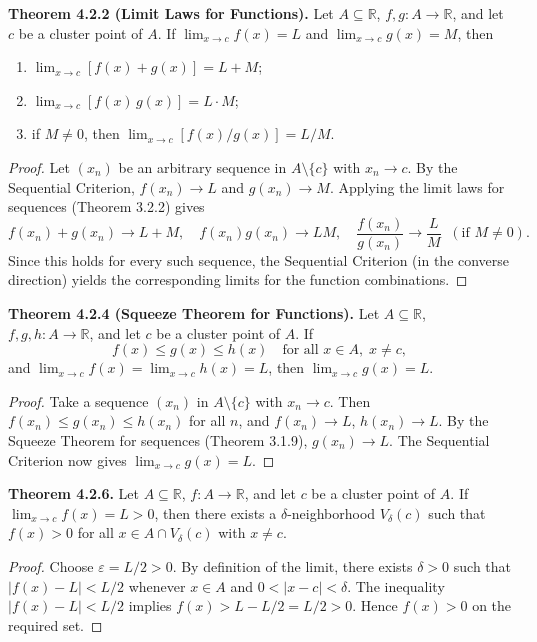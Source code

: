 \documentclass[12pt,a4paper]{article}
\theoremstyle{definition}
\newcommand{\R}{\mathbb{R}}
\newcommand{\eps}{\varepsilon}
\newcommand{\abs}[1]{\left\lvert#1\right\rvert}
\begin{document}
\textbf{Theorem 4.2.2 (Limit Laws for Functions).} Let \(A\subseteq\R\), \(f,g:A\to\R\), and let \(c\) be a cluster point of \(A\). If \(\lim_{x\to c}f(x)=L\) and \(\lim_{x\to c}g(x)=M\), then
\begin{enumerate}[label=(\alph*)]
    \item \(\lim_{x\to c}[f(x)+g(x)] = L+M\);
    \item \(\lim_{x\to c}[f(x)\,g(x)] = L\cdot M\);
    \item if \(M\neq0\), then \(\lim_{x\to c}[f(x)/g(x)] = L/M\).
\end{enumerate}

\begin{proof}
Let \((x_n)\) be an arbitrary sequence in \(A\setminus\{c\}\) with \(x_n\to c\). By the Sequential Criterion, \(f(x_n)\to L\) and \(g(x_n)\to M\). Applying the limit laws for sequences (Theorem 3.2.2) gives
\[
f(x_n)+g(x_n)\to L+M,\quad f(x_n)g(x_n)\to L M,\quad \frac{f(x_n)}{g(x_n)}\to \frac{L}{M}\;\;(\text{if }M\neq0).
\]
Since this holds for every such sequence, the Sequential Criterion (in the converse direction) yields the corresponding limits for the function combinations.
\end{proof}

\textbf{Theorem 4.2.4 (Squeeze Theorem for Functions).} Let \(A\subseteq\R\), \(f,g,h:A\to\R\), and let \(c\) be a cluster point of \(A\). If
\[
f(x)\le g(x)\le h(x)\quad\text{for all }x\in A,\;x\neq c,
\]
and \(\lim_{x\to c}f(x)=\lim_{x\to c}h(x)=L\), then \(\lim_{x\to c}g(x)=L\).

\begin{proof}
Take a sequence \((x_n)\) in \(A\setminus\{c\}\) with \(x_n\to c\). Then \(f(x_n)\le g(x_n)\le h(x_n)\) for all \(n\), and \(f(x_n)\to L\), \(h(x_n)\to L\). By the Squeeze Theorem for sequences (Theorem 3.1.9), \(g(x_n)\to L\). The Sequential Criterion now gives \(\lim_{x\to c}g(x)=L\).
\end{proof}

\textbf{Theorem 4.2.6.} Let \(A\subseteq\R\), \(f:A\to\R\), and let \(c\) be a cluster point of \(A\). If \(\lim_{x\to c}f(x)=L>0\), then there exists a \(\delta\)-neighborhood \(V_\delta(c)\) such that \(f(x)>0\) for all \(x\in A\cap V_\delta(c)\) with \(x\neq c\).

\begin{proof}
Choose \(\eps = L/2>0\). By definition of the limit, there exists \(\delta>0\) such that \(\abs{f(x)-L}<L/2\) whenever \(x\in A\) and \(0<\abs{x-c}<\delta\). The inequality \(\abs{f(x)-L}<L/2\) implies \(f(x) > L - L/2 = L/2 > 0\). Hence \(f(x)>0\) on the required set.
\end{proof}
\end{document}
